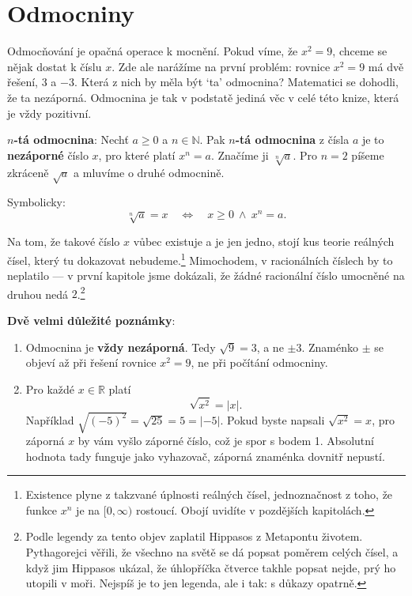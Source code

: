 \section{Odmocniny}

Odmocňování je opačná operace k mocnění. Pokud víme, že $x^2 = 9$, chceme se nějak dostat k číslu $x$. Zde ale narážíme na první problém: rovnice $x^2 = 9$ má dvě řešení, $3$ a $-3$. Která z nich by měla být `ta' odmocnina? Matematici se dohodli, že ta nezáporná. Odmocnina je tak v podstatě jediná věc v celé této knize, která je vždy pozitivní.

\begin{definitionbox}
  \textbf{$n$-tá odmocnina}: Nechť $a \geq 0$ a $n\in\mathbb{N}$. Pak \textbf{$n$-tá odmocnina} z čísla $a$ je to \textbf{nezáporné} číslo $x$, pro které platí $x^n = a$. Značíme ji $\sqrt[n]{a}$. Pro $n = 2$ píšeme zkráceně $\sqrt{a}$ a mluvíme o druhé odmocnině.

  \vspace{0.2cm}

  Symbolicky:
  \begin{equation*}
    \sqrt[n]{a} = x \quad\Leftrightarrow\quad x\geq 0\ \land\ x^n = a.
  \end{equation*}
\end{definitionbox}

Na tom, že takové číslo $x$ vůbec existuje a je jen jedno, stojí kus teorie reálných čísel, který tu dokazovat nebudeme.\footnote{Existence plyne z takzvané úplnosti reálných čísel, jednoznačnost z toho, že funkce $x^n$ je na $[0, \infty)$ rostoucí. Obojí uvidíte v pozdějších kapitolách.} Mimochodem, v racionálních číslech by to neplatilo --- v první kapitole jsme dokázali, že žádné racionální číslo umocněné na druhou nedá $2$.\footnote{Podle legendy za tento objev zaplatil Hippasos z Metapontu životem. Pythagorejci věřili, že všechno na světě se dá popsat poměrem celých čísel, a když jim Hippasos ukázal, že úhlopříčka čtverce takhle popsat nejde, prý ho utopili v moři. Nejspíš je to jen legenda, ale i tak: s důkazy opatrně.}

\begin{definitionbox}
  \textbf{Dvě velmi důležité poznámky}:
  \begin{enumerate}
    \item Odmocnina je \textbf{vždy nezáporná}. Tedy $\sqrt{9} = 3$, a ne $\pm 3$. Znaménko $\pm$ se objeví až při řešení rovnice $x^2 = 9$, ne při počítání odmocniny.
    \item Pro každé $x\in\mathbb{R}$ platí
    \begin{equation*}
      \sqrt{x^2} = |x|.
    \end{equation*}
    Například $\sqrt{{(-5)}^2} = \sqrt{25} = 5 = |-5|$. Pokud byste napsali $\sqrt{x^2} = x$, pro záporná $x$ by vám vyšlo záporné číslo, což je spor s bodem 1. Absolutní hodnota tady funguje jako vyhazovač, záporná znaménka dovnitř nepustí.
  \end{enumerate}
\end{definitionbox}

